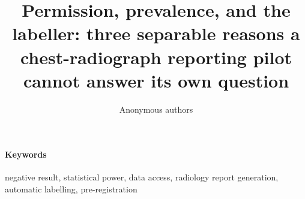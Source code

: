 \documentclass[11pt]{article}
\title{Permission, prevalence, and the labeller: three separable reasons a
chest-radiograph reporting pilot cannot answer its own question}
\author{Anonymous authors}
\date{}
\numberwithin{equation}{section}
\begin{document}
\maketitle

\begin{abstract}

\end{abstract}

\paragraph{Keywords} negative result, statistical power, data access, radiology report generation, automatic labelling, pre-registration





\end{document}
